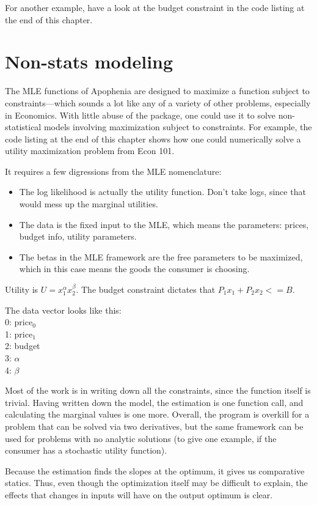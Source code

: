 For another example, have a look at the budget constraint in the code
listing at the end of this chapter.

\section{Non-stats modeling}    \label{econ101}

The MLE functions of Apophenia are designed to maximize a function
subject to constraints---which sounds a lot like any of a variety of
other problems, especially in Economics. With little abuse of the package,
one could use it to solve non-statistical models involving maximization
subject to constraints. For example, the code listing at the end of this
chapter shows how one could numerically solve a utility maximization
problem from Econ 101. 

It requires a few digressions from the MLE nomenclature:
\begin{itemize}
\item The log likelihood is actually the utility function. Don't take logs,
since that would mess up the marginal utilities.

\item The data is the fixed input to the MLE, which means the parameters:
prices, budget info, utility parameters.

\item The betas in the MLE framework are the free parameters to be
maximized, which in this case means the goods the consumer is choosing.
\end{itemize}

Utility is $U = x_1^\alpha x_2^\beta$. 
The budget constraint dictates that $P_1 x_1 + P_2 x_2 <= B$.
                                                             
The data vector looks like this:\\
0:  price$_0$\\
1:  price$_1$\\
2:  budget \\
3:  $\alpha$  \\
4:  $\beta$   
                                                             
Most of the work is in writing down all the constraints, since the
function itself is trivial. Having written down the model, the estimation
is one function call, and calculating the marginal values is one more.
Overall, the program is overkill for a problem that can be solved via
two derivatives, but the same framework can be used for problems with no
analytic solutions (to give one example, if the consumer has a stochastic
utility function).

Because the estimation finds the slopes at the optimum, it gives us
comparative statics. Thus, even though the optimization itself may be
difficult to explain, the effects that changes in inputs will have on
the output optimum is clear.



